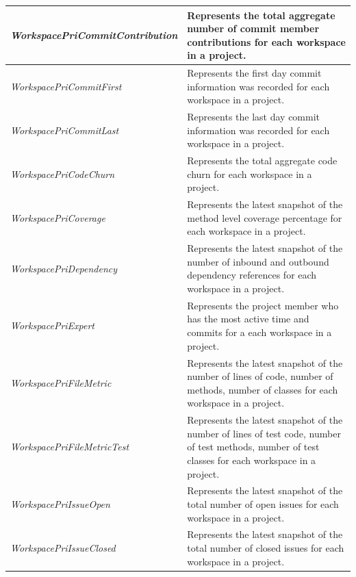\begin{table}[htbp]
\begin{center}
\begin{tabular}{|p{5.5cm}|p{9.5cm}|}
\small{}\emph{WorkspacePriCommitContribution} & \small{}
Represents the total aggregate number of commit member contributions for
each workspace in a project. \\ \hline 

\small{}\emph{WorkspacePriCommitFirst} & \small{}
Represents the first day commit information was recorded for each workspace
in a project. \\ \hline 

\small{}\emph{WorkspacePriCommitLast} & \small{}
Represents the last day commit information was recorded for each workspace
in a project. \\ \hline 

\small{}\emph{WorkspacePriCodeChurn} & \small{}
Represents the total aggregate code churn for each workspace in a
project. \\ \hline

\small{}\emph{WorkspacePriCoverage} & \small{}
Represents the latest snapshot of the method level coverage percentage for
each workspace in a project.  \\ \hline 

\small{}\emph{WorkspacePriDependency} & \small{}
Represents the latest snapshot of the number of inbound and outbound
dependency references for each workspace in a project. \\ \hline 

\small{}\emph{WorkspacePriExpert} & \small{}
Represents the project member who has the most active time and commits for
a each workspace in a project. \\ \hline

\small{}\emph{WorkspacePriFileMetric} & \small{}
Represents the latest snapshot of the number of lines of code, number of
methods, number of classes for each workspace in a project.\\ \hline 

\small{}\emph{WorkspacePriFileMetricTest} & \small{}
Represents the latest snapshot of the number of lines of test code,  number
of test methods, number of test classes for each workspace in a project.\\ \hline   

\small{}\emph{WorkspacePriIssueOpen} & \small{}
Represents the latest snapshot of the total number of open issues for each
workspace in a project. \\ \hline 

\small{}\emph{WorkspacePriIssueClosed} & \small{}
Represents the latest snapshot of the total number of closed issues for
each workspace in a project. \\ \hline 


\end{tabular}
\end{center}
\end{table}
